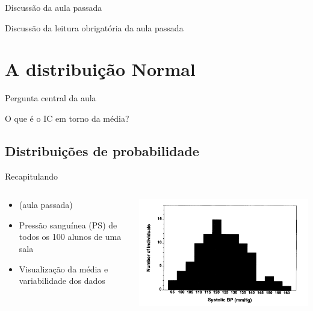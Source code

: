 \documentclass{beamer}
\begin{document}

\begin{frame}{\scriptsize Discussão da aula passada}
  \begin{block}{}
    Discussão da leitura obrigatória da aula passada
  \end{block}
\end{frame}

\section{A distribuição Normal}

\begin{frame}[label=oquee]{\scriptsize Pergunta central da aula}
  \begin{block}{}
    \Large\centering
    O que é o IC em torno da média?
  \end{block}
\end{frame}

\subsection{Distribuições de probabilidade}

\begin{frame}{\scriptsize Recapitulando}
  \begin{columns}
    \begin{column}{5cm}
      \begin{itemize}
        \scriptsize
      \item ({\tiny aula passada})
        \bigskip
      \item Pressão sanguínea (PS) de todos os 100 alunos de uma sala
        \medskip
      \item Visualização da média e variabilidade dos dados
      \end{itemize}
    \end{column}
    \begin{column}{5cm}
      \includegraphics[width=\textwidth]{Cap3/histograma1}
    \end{column}
  \end{columns}
\end{frame}
\end{document}
